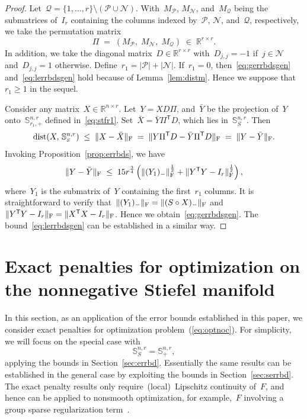 \documentclass[11pt,a4paper]{article}  %
\theoremstyle{definition}
\DeclareMathOperator{\dist}{dist}
\newcommand{\QQ}{\mathcal{Q}}
\newcommand{\RR}{\mathbb{R}}
\newcommand{\col}{r}
\newcommand{\stf}[1]{\mathbb{S}^{#1}}
\newcommand{\sss}[1]{{\scriptscriptstyle{#1}}}
\newcommand{\fro}{{\scriptstyle{\textnormal{F}}}}
\newcommand{\trs}{{\scriptstyle{\mathsf{T}}}}
\newcommand{\signmat}{S}
\newcommand{\tsign}{{\scriptscriptstyle{S}}}
\newcommand{\posset}{\mathcal{P}}
\newcommand{\negset}{\mathcal{N}}
\newcommand{\hp}{\circ}
\begin{document}
\begin{proof}
    Let~$\QQ = \{1, \dots, \col\}\setminus (\posset \cup \negset)$.
    With~$M_{\sss{\posset}}$, $M_{\sss{\negset}}$, and~$M_{\QQ}$ being
    the submatrices of~$I_\col$ containing the columns indexed by~$\posset$, $\negset$, and~$\QQ$,
    respectively, we take
    the permutation matrix
    \[
        \Pi \;=\;  (M_{\sss{\posset}}, \; M_{\sss{\negset}}, \; M_{\sss{\QQ}}) \;\in\;
        \RR^{\col\times\col}.
    \]
    In addition, we take the diagonal matrix~$D\in\RR^{\col\times\col}$ with~$D_{j,j} = -1$
    if~$j\in\negset$ and~$D_{j,j} = 1$ otherwise.
    Define~$\col_1 = |\posset| + |\negset|$. If~$\col_1 = 0$, then~\eqref{eq:gerrbdsgen}
    and~\eqref{eq:lerrbdsgen} hold because of Lemma~\ref{lem:distm}. Hence we suppose
    that~$\col_1\ge 1$ in the sequel.

    Consider any matrix~$X\in\RR^{n\times \col}$. Let~$Y = X D \Pi$, and~$\bar{Y}$ be the projection
    of~$Y$ onto~$\stf{n,\col}_{\col_1,+}$ defined in~\eqref{eq:stfr1}.
    Set~$\bar{X} = \bar{Y}\Pi^\trs D$, which lies in~$\stf{n,\col}_\tsign$. Then
    \[
        \dist(X,\, \stf{n,\col}_\tsign) \;\le\; \|X - \bar{X}\|_\fro \;=\;\|Y\Pi^\trs D - \bar{Y}
        \Pi^\trs D\|_\fro
        \;=\;\|Y - \bar{Y}\|_\fro.
    \]
    Invoking Proposition~\ref{prop:errbds}, we have
    \[
        \|Y-\bar{Y}\|_\fro \;\le\;
        15\col^{\frac{3}{4}}
        \left( \|(Y_1)_{-}\|_\fro^{\frac{1}{2}} + \|Y^\trs  Y - I_\col\|_\fro ^{\frac{1}{2}} \right),
    \]
    where~$Y_1$ is the submatrix of~$Y$ containing the first~$\col_1$ columns. It is
    straightforward to verify that~$\|(Y_1)_{-}\|_\fro = \|(\signmat\hp X)_{-}\|_\fro$
    and~$\|Y^\trs Y - I_\col\|_\fro = \|X^\trs X - I_\col\|_\fro$. Hence we obtain~\eqref{eq:gerrbdsgen}. The
    bound~\eqref{eq:lerrbdsgen} can be established in a similar way.
\end{proof}





\section{Exact penalties for optimization on the nonnegative Stiefel manifold}
\label{sec:exactpen}

 In this section, as an application of the error bounds established in this paper,
we consider exact penalties for optimization problem~(\ref{eq:optnoc}). For simplicity, we will
focus on the special case with
\[
    \stf{n,\col}_{\signmat} = \stf{n,\col}_+,
\]
applying the bounds in Section~\ref{sec:errbd}.
Essentially the same results can be established in the general case
by exploiting the bounds in Section~\ref{sec:serrbd}.
The exact penalty results only require~(local)~Lipschitz continuity of~$F$, and hence
can be applied to nonsmooth optimization,
for example,~$F$ involving a group sparse regularization term~\cite{Xiao_Liu_Yuan_2021}.
\end{document}
